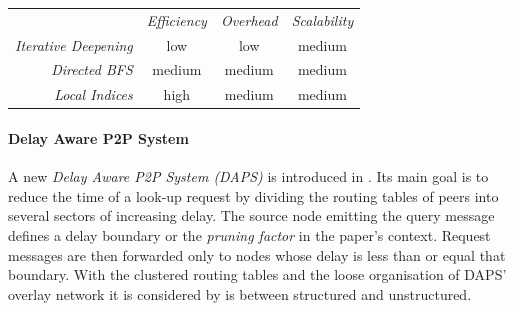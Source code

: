 \begin{center}
\begin{tabular}{rccc}
\multicolumn{1}{r}{} &
\multicolumn{1}{c}{\emph{Efficiency}} &
\multicolumn{1}{c}{\emph{Overhead}} &
\multicolumn{1}{c}{\emph{Scalability}}
\\
\cline{2-4}
\emph{Iterative Deepening} &
low &
low &
% 
medium \\
\emph{Directed BFS} &
medium &
medium &
medium \\
\emph{Local Indices} &
high &
medium &
medium \\
\end{tabular}
\end{center}

\paragraph*{ \bf Delay Aware P2P System}
A new \emph{Delay Aware P2P System (DAPS)} is introduced in \cite{ZL2005}. Its
main goal is to reduce the time of a look-up request by dividing the routing
tables of peers into several sectors of increasing delay. The source node
emitting the query message defines a delay boundary or the \emph{pruning
factor} in the paper's context. Request messages are then forwarded only to
nodes whose delay is less than or equal that boundary. With the clustered
routing tables and the loose organisation of DAPS' overlay network it is
considered by is between structured and unstructured.

